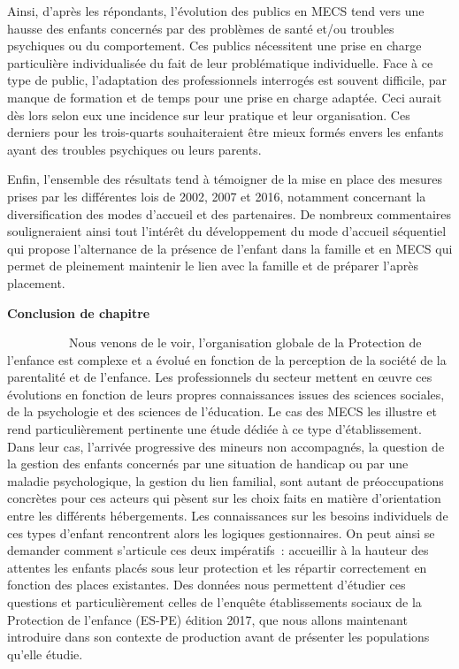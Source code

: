 \documentclass[
  12,
  a4paper,
]{report}
\begin{document}
Ainsi, d'après les répondants, l'évolution des publics en MECS tend vers
une hausse des enfants concernés par des problèmes de santé et/ou
troubles psychiques ou du comportement. Ces publics nécessitent une
prise en charge particulière individualisée du fait de leur
problématique individuelle. Face à ce type de public, l'adaptation des
professionnels interrogés est souvent difficile, par manque de formation
et de temps pour une prise en charge adaptée. Ceci aurait dès lors selon
eux une incidence sur leur pratique et leur organisation. Ces derniers
pour les trois-quarts souhaiteraient être mieux formés envers les
enfants ayant des troubles psychiques ou leurs parents.

Enfin, l'ensemble des résultats tend à témoigner de la mise en place des
mesures prises par les différentes lois de 2002, 2007 et 2016, notamment
concernant la diversification des modes d'accueil et des partenaires. De
nombreux commentaires souligneraient ainsi tout l'intérêt du
développement du mode d'accueil séquentiel qui propose l'alternance de
la présence de l'enfant dans la famille et en MECS qui permet de
pleinement maintenir le lien avec la famille et de préparer l'après
placement.

\textbf{Conclusion de chapitre}

~~~~~~~~~~Nous venons de le voir, l'organisation globale de la
Protection de l'enfance est complexe et a évolué en fonction de la
perception de la société de la parentalité et de l'enfance. Les
professionnels du secteur mettent en œuvre ces évolutions en fonction de
leurs propres connaissances issues des sciences sociales, de la
psychologie et des sciences de l'éducation. Le cas des MECS les illustre
et rend particulièrement pertinente une étude dédiée à ce type
d'établissement. Dans leur cas, l'arrivée progressive des mineurs non
accompagnés, la question de la gestion des enfants concernés par une
situation de handicap ou par une maladie psychologique, la gestion du
lien familial, sont autant de préoccupations concrètes pour ces acteurs
qui pèsent sur les choix faits en matière d'orientation entre les
différents hébergements. Les connaissances sur les besoins individuels
de ces types d'enfant rencontrent alors les logiques gestionnaires. On
peut ainsi se demander comment s'articule ces deux impératifs~:
accueillir à la hauteur des attentes les enfants placés sous leur
protection et les répartir correctement en fonction des places
existantes. Des données nous permettent d'étudier ces questions et
particulièrement celles de l'enquête établissements sociaux de la
Protection de l'enfance (ES-PE) édition 2017, que nous allons maintenant
introduire dans son contexte de production avant de présenter les
populations qu'elle étudie.
\end{document}
